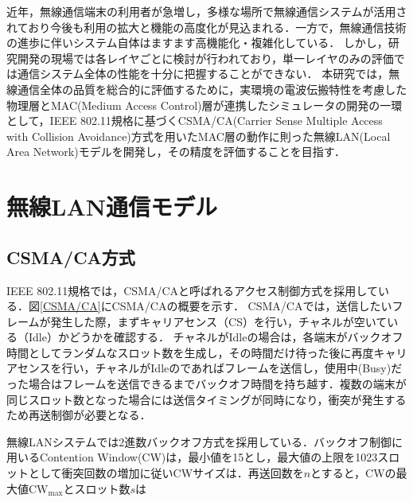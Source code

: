 \documentclass[a4paper, 10pt]{ltjsarticle}
\begin{document}
近年，無線通信端末の利用者が急増し，多様な場所で無線通信システムが活用されており今後も利用の拡大と機能の高度化が見込まれる．一方で，無線通信技術の進歩に伴いシステム自体はますます高機能化・複雑化している．
しかし，研究開発の現場では各レイヤごとに検討が行われており，単一レイヤのみの評価では通信システム全体の性能を十分に把握することができない．
本研究では，無線通信全体の品質を総合的に評価するために，実環境の電波伝搬特性を考慮した物理層とMAC(Medium Access Control)層が連携したシミュレータの開発の一環として，IEEE 802.11規格に基づくCSMA/CA(Carrier Sense Multiple Access with Collision Avoidance)方式を用いたMAC層の動作に則った無線LAN(Local Area Network)モデルを開発し，その精度を評価することを目指す．


\section{無線LAN通信モデル}


\subsection{CSMA/CA方式}


IEEE 802.11規格では，CSMA/CAと呼ばれるアクセス制御方式を採用している．図\ref{CSMA/CA}にCSMA/CAの概要を示す．
CSMA/CAでは，送信したいフレームが発生した際，まずキャリアセンス（CS）を行い，チャネルが空いている（Idle）かどうかを確認する．
チャネルがIdleの場合は，各端末がバックオフ時間としてランダムなスロット数を生成し，その時間だけ待った後に再度キャリアセンスを行い，チャネルがIdleのであればフレームを送信し，使用中(Busy)だった場合はフレームを送信できるまでバックオフ時間を持ち越す．複数の端末が同じスロット数となった場合には送信タイミングが同時になり，衝突が発生するため再送制御が必要となる．

無線LANシステムでは2進数バックオフ方式を採用している．バックオフ制御に用いるContention Window(CW)は，最小値を15とし，最大値の上限を1023スロットとして衝突回数の増加に従いCWサイズは．再送回数を$n$とすると，CWの最大値$\mathrm{CW}_{\max}$とスロット数$s$は
\end{document}
